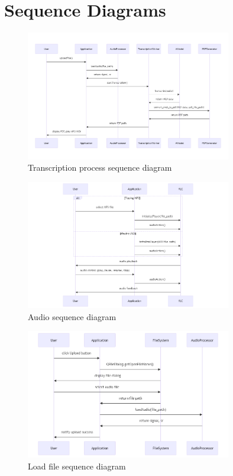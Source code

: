 \documentclass{article}
\begin{document}
\section{Sequence Diagrams}

\begin{figure}[h!]
    \centering
    \includegraphics[width=0.8\textwidth]{../diagrams/transcription_seq.png}
    \caption{Transcription process sequence diagram}
    \label{fig:transcription_sequence_diagram}
\end{figure}

\begin{figure}[h!]
    \centering
    \includegraphics[width=0.8\textwidth]{../diagrams/audio_seq.png}
    \caption{Audio sequence diagram}
    \label{fig:audio_sequence_diagram}
\end{figure}

\begin{figure}[h!]
    \centering
    \includegraphics[width=0.8\textwidth]{../diagrams/load_audio_seq.png}
    \caption{Load file sequence diagram}
    \label{fig:load_audio_sequence_diagram}
\end{figure}
\end{document}
